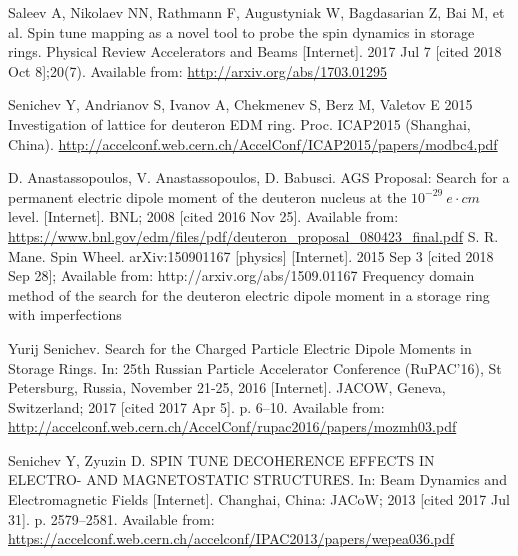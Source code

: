 \documentclass{article}
\begin{document}
\begin{thebibliography}{99}
  Saleev A, Nikolaev NN, Rathmann F, Augustyniak W, Bagdasarian Z, Bai M, et al. Spin tune mapping as a novel tool to probe the spin dynamics in storage rings. Physical Review Accelerators and Beams [Internet]. 2017 Jul 7 [cited 2018 Oct 8];20(7). Available from: \url{http://arxiv.org/abs/1703.01295}
  
  Senichev Y, Andrianov S, Ivanov A, Chekmenev S, Berz M, Valetov E 2015 Investigation of lattice for deuteron EDM ring. Proc. ICAP2015 (Shanghai, China). \url{http://accelconf.web.cern.ch/AccelConf/ICAP2015/papers/modbc4.pdf}

  D. Anastassopoulos, V. Anastassopoulos, D. Babusci. AGS Proposal: Search for a permanent electric dipole moment of the deuteron nucleus at the $10^{−29} ~ e\cdot cm$ level. [Internet]. BNL; 2008 [cited 2016 Nov 25]. Available from: \url{https://www.bnl.gov/edm/files/pdf/deuteron_proposal_080423_final.pdf}
  S. R. Mane. Spin Wheel. arXiv:150901167 [physics] [Internet]. 2015 Sep 3 [cited 2018 Sep 28]; Available from: http://arxiv.org/abs/1509.01167
  Frequency domain method of the search for the deuteron electric dipole moment in a storage ring with imperfections

  Yurij Senichev. Search for the Charged Particle Electric Dipole Moments in Storage Rings. In: 25th Russian Particle Accelerator Conference (RuPAC’16), St Petersburg, Russia, November 21-25, 2016 [Internet]. JACOW, Geneva, Switzerland; 2017 [cited 2017 Apr 5]. p. 6–10. Available from: \url{http://accelconf.web.cern.ch/AccelConf/rupac2016/papers/mozmh03.pdf}

  Senichev Y, Zyuzin D. SPIN TUNE DECOHERENCE EFFECTS IN ELECTRO- AND  MAGNETOSTATIC STRUCTURES. In: Beam Dynamics and Electromagnetic Fields [Internet]. Changhai, China: JACoW; 2013 [cited 2017 Jul 31]. p. 2579--2581. Available from: \url{https://accelconf.web.cern.ch/accelconf/IPAC2013/papers/wepea036.pdf}

\end{thebibliography}
\end{document}
